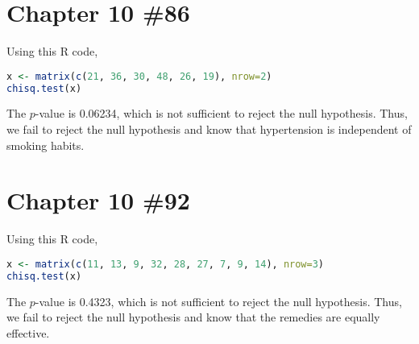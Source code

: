\documentclass{scrartcl}
\begin{document}
\section{Chapter 10 \#86}
Using this R code,
\begin{lstlisting}[language=R]
x <- matrix(c(21, 36, 30, 48, 26, 19), nrow=2)
chisq.test(x)
\end{lstlisting}
The \(p\)-value is 0.06234, which is not sufficient to reject the null
hypothesis. Thus, we fail to reject the null hypothesis and know that
hypertension is independent of smoking habits.

\section{Chapter 10 \#92}
Using this R code,
\begin{lstlisting}[language=R]
x <- matrix(c(11, 13, 9, 32, 28, 27, 7, 9, 14), nrow=3)
chisq.test(x)
\end{lstlisting}
The \(p\)-value is 0.4323, which is not sufficient to reject the null
hypothesis. Thus, we fail to reject the null hypothesis and know that the
remedies are equally effective.
\end{document}

